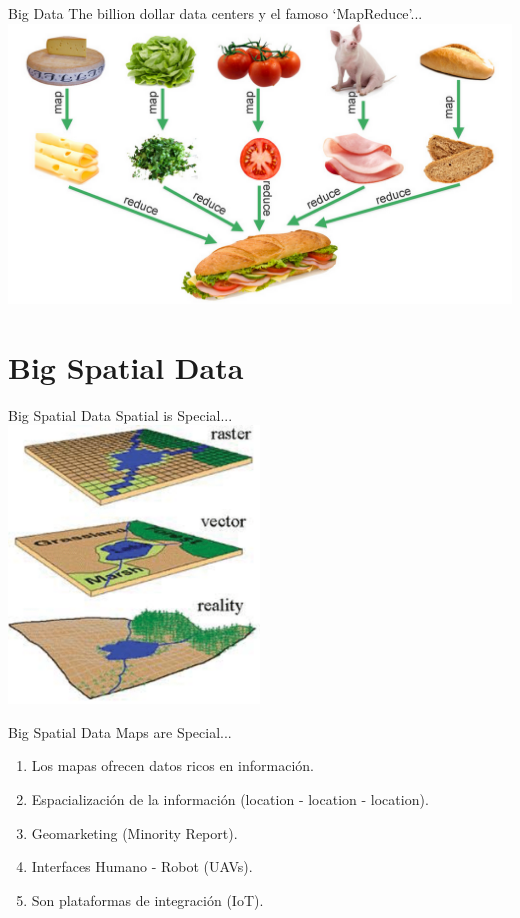 \documentclass{beamer}
\begin{document}
\begin{frame}{Big Data}
The billion dollar data centers y el famoso `MapReduce'...
  \centering
  \includegraphics[width=\textwidth]{figures/mapreduce}
\end{frame}

\section{Big Spatial Data}

\begin{frame}{Big Spatial Data}
    Spatial is Special... \\
    \centering
    \includegraphics[width=0.5\textwidth]{figures/geomodels}
\end{frame}

\begin{frame}{Big Spatial Data}
    Maps are Special... \\
    \begin{enumerate}
        \item Los mapas ofrecen datos ricos en información.
        \item Espacialización de la información (location - location - location).
        \item Geomarketing (Minority Report).
        \item Interfaces Humano - Robot (UAVs).
        \item Son plataformas de integración (IoT).
    \end{enumerate}
\end{frame}
\end{document}
